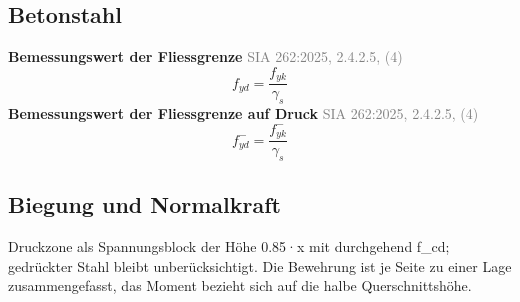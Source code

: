 \documentclass[11pt,a4paper]{article}
\newcommand{\normref}[1]{{\small\textcolor{gray}{#1}}}
\begin{document}
\subsection{Betonstahl}
\noindent\textbf{Bemessungswert der Fliessgrenze} \hfill \normref{SIA 262:2025, 2.4.2.5, (4)}
\begin{equation*}
f_{yd} = \frac{f_{yk}}{\gamma_s}
\end{equation*}
\noindent\textbf{Bemessungswert der Fliessgrenze auf Druck} \hfill \normref{SIA 262:2025, 2.4.2.5, (4)}
\begin{equation*}
f_{yd}^{-} = \frac{f_{yk}^{-}}{\gamma_s}
\end{equation*}
\subsection{Biegung und Normalkraft}
Druckzone als Spannungsblock der Höhe 0.85·x mit durchgehend f\_cd; gedrückter Stahl bleibt unberücksichtigt. Die Bewehrung ist je Seite zu einer Lage zusammengefasst, das Moment bezieht sich auf die halbe Querschnittshöhe.
\end{document}
